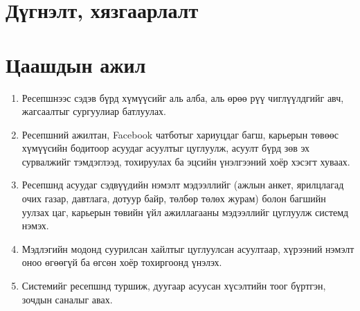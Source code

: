 \iffull
\chapter{Дүгнэлт, хязгаарлалт}
\else
\chapter{Цаашдын ажил}
\fi
\label{ch:conclusion}



\begin{enumerate}
    \item Ресепшнээс сэдэв бүрд хүмүүсийг аль алба, аль өрөө рүү чиглүүлдгийг авч, жагсаалтыг сургуулиар батлуулах.
    \item Ресепшний ажилтан, Facebook чатботыг хариуцдаг багш, карьерын төвөөс хүмүүсийн бодитоор асуудаг асуултыг цуглуулж, асуулт бүрд зөв эх сурвалжийг тэмдэглээд, тохируулах ба эцсийн үнэлгээний хоёр хэсэгт хуваах.
    \item Ресепшнд асуудаг сэдвүүдийн нэмэлт мэдээллийг (ажлын анкет, ярилцлагад очих газар, давтлага, дотуур байр, төлбөр төлөх журам) болон багшийн уулзах цаг, карьерын төвийн үйл ажиллагааны мэдээллийг цуглуулж системд нэмэх.
    \item Мэдлэгийн модонд суурилсан хайлтыг цуглуулсан асуултаар, хүрээний нэмэлт оноо өгөөгүй ба өгсөн хоёр тохиргоонд үнэлэх.
    \item Системийг ресепшнд туршиж, дуугаар асуусан хүсэлтийн тоог бүртгэн, зочдын саналыг авах.
\end{enumerate}
